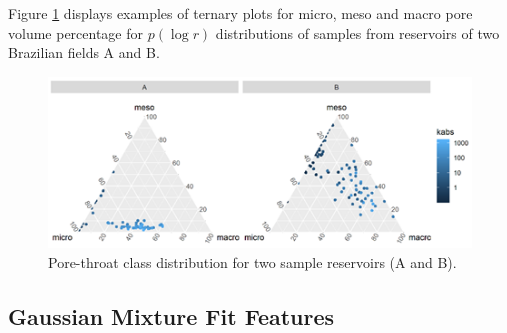 \documentclass[english,msc,numbers]{coppe}
\begin{document}
  Figure \ref{fig:pchg-classes} displays examples of ternary plots for micro, meso and macro pore volume percentage for \(p(\log{r})\) distributions of samples from reservoirs of two Brazilian fields A and B.
  \begin{figure}
  
  {\centering \includegraphics[width=0.75\linewidth]{figure/3-1-pchg-classes} 
  
  }
  
  \caption{Pore-throat class distribution for two sample reservoirs (A and B).}\label{fig:pchg-classes}
  \end{figure}
  \hypertarget{gauss-mixture-fit-feat}{%
  \subsection{Gaussian Mixture Fit Features}\label{gauss-mixture-fit-feat}}
  
\end{document}
